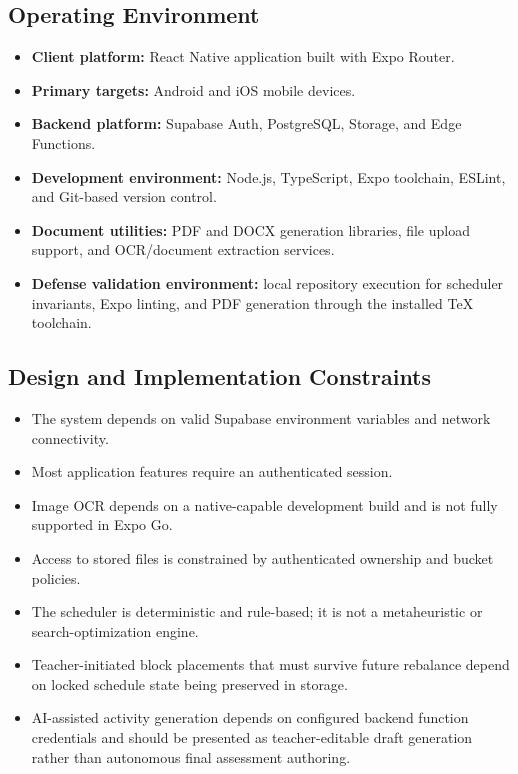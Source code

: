 \documentclass[12pt]{article}
\begin{document}
\subsection{Operating Environment}

\begin{itemize}
\item \textbf{Client platform:} React Native application built with Expo Router.
\item \textbf{Primary targets:} Android and iOS mobile devices.
\item \textbf{Backend platform:} Supabase Auth, PostgreSQL, Storage, and Edge Functions.
\item \textbf{Development environment:} Node.js, TypeScript, Expo toolchain, ESLint, and Git-based version control.
\item \textbf{Document utilities:} PDF and DOCX generation libraries, file upload support, and OCR/document extraction services.
\item \textbf{Defense validation environment:} local repository execution for scheduler invariants, Expo linting, and PDF generation through the installed TeX toolchain.
\end{itemize}

\subsection{Design and Implementation Constraints}

\begin{itemize}
\item The system depends on valid Supabase environment variables and network connectivity.
\item Most application features require an authenticated session.
\item Image OCR depends on a native-capable development build and is not fully supported in Expo Go.
\item Access to stored files is constrained by authenticated ownership and bucket policies.
\item The scheduler is deterministic and rule-based; it is not a metaheuristic or search-optimization engine.
\item Teacher-initiated block placements that must survive future rebalance depend on locked schedule state being preserved in storage.
\item AI-assisted activity generation depends on configured backend function credentials and should be presented as teacher-editable draft generation rather than autonomous final assessment authoring.
\end{itemize}
\end{document}
